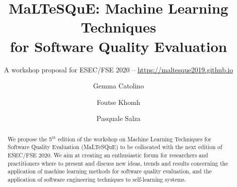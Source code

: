 \documentclass[sigconf,review]{acmart}
\begin{document}
	\title{MaLTeSQuE: Machine Learning Techniques \\
		for Software Quality Evaluation}
	\subtitle{A workshop proposal for ESEC/FSE 2020 -- \url{https://maltesque2019.github.io}}
	
	\author{Gemma Catolino}
	
		\author{Foutse Khomh}
	
	\author{Pasquale Salza}
	
	
	
\begin{abstract}
We propose the 5$^{th}$ edition of the workshop on Machine Learning Techniques for Software Quality Evaluation (MaLTeSQuE) to be collocated with the next edition of ESEC/FSE 2020.
We aim at creating an enthusiastic forum for researchers and practitioners where to present and discuss new ideas, trends and results concerning the application of machine learning methods for software quality evaluation, and the application of software engineering techniques to self-learning systems.
\end{abstract}


\maketitle







\balance
	
\end{document}
